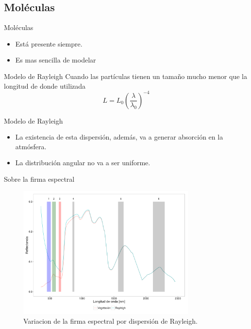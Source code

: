 \documentclass[]{beamer}
\begin{document}
\subsection{Moléculas}
\begin{frame}{Moléculas}
  \begin{itemize}
    \item Está presente siempre.
    \item Es mas sencilla de modelar
  \end{itemize}
\end{frame}
\begin{frame}{Modelo de Rayleigh}
  Cuando las partículas tienen un tamaño mucho menor que la longitud de donde utilizada
  \begin{equation}
    L = L_0 \left( \frac{\lambda}{\lambda_0} \right)^{-4}
  \end{equation}
\end{frame}

\begin{frame}{Modelo de Rayleigh}
  \begin{itemize}[<+->]
    \item La existencia de esta dispersión, además, va a generar absorción en la atmósfera.
    \item La distribución angular no va a ser uniforme.
  \end{itemize}
\end{frame}

\begin{frame}{Sobre la firma espectral}
  \begin{figure}
  \centering
  \includegraphics[width=0.8\textwidth]{imagenes/rayleigh.png}
  \caption{Variacion de la firma espectral por dispersión de Rayleigh. }
  \end{figure}
\end{frame}
\end{document}

